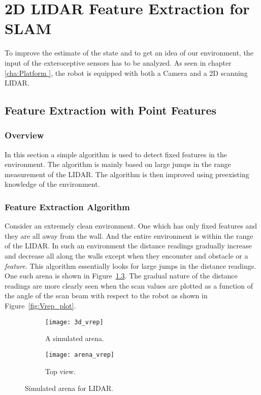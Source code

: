 \chapter{2D LIDAR Feature Extraction for SLAM}
\label{cha:featureExtractors}
To improve the estimate of the state and to get an idea of our environment, the input of the exteroceptive sensors has to be analyzed. As seen in chapter \ref{cha:Platform }, the robot is equipped with both a Camera and a 2D scanning LIDAR.

\section{Feature Extraction with Point Features}
\label{sec:spike}
\subsection{Overview}
 In this section a simple algorithm is used to detect fixed features in the environment. The algorithm is mainly based on large jumps in the range measurement of the LIDAR. The algorithm is then improved using preexisting knowledge of the environment.

\subsection{Feature Extraction Algorithm}
\label{sec: spikeAlgo}
Consider an extremely clean environment. One which has only fixed features and they are all away from the wall. And the entire environment is within the range of the LIDAR. In such an environment the distance readings gradually increase and decrease all along the walls except when they encounter and obstacle or a \textit{feature}. This algorithm essentially looks for large jumps in the distance readings. One such arena is shown in Figure~\ref{fig:Simulated_1}. The gradual nature of the distance readings are more clearly seen when the scan values are plotted as a function of the angle of the scan beam with respect to the robot as shown in Figure~\ref{fig:Vrep_plot}.
\begin{figure}[h!]
    \centering
    \begin{subfigure}[b]{0.3\textwidth}
    
	    \texttt{[image: 3d\_vrep]}
	    \caption{A simulated arena.}
	    \label{fig:3d_vrep}
    \end{subfigure}
    \quad %
    \begin{subfigure}[b]{0.3\textwidth}
        \texttt{[image: arena\_vrep]}
        \caption{Top view.}
        \label{fig:arena_vrep}
    \end{subfigure}%
        \caption{Simulated arena for LIDAR.}
        \label{fig:Simulated_1}
\end{figure}

